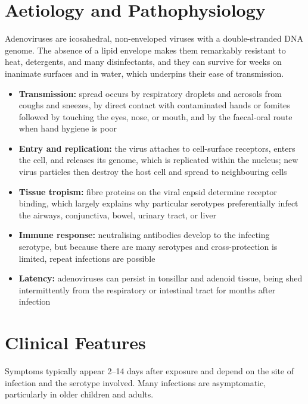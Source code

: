 \section*{Aetiology and Pathophysiology}
Adenoviruses are icosahedral, non-enveloped viruses with a double-stranded DNA genome. The absence of a lipid envelope makes them remarkably resistant to heat, detergents, and many disinfectants, and they can survive for weeks on inanimate surfaces and in water, which underpins their ease of transmission.

\begin{itemize}
    \item \textbf{Transmission:} spread occurs by respiratory droplets and aerosols from coughs and sneezes, by direct contact with contaminated hands or fomites followed by touching the eyes, nose, or mouth, and by the faecal-oral route when hand hygiene is poor
    \item \textbf{Entry and replication:} the virus attaches to cell-surface receptors, enters the cell, and releases its genome, which is replicated within the nucleus; new virus particles then destroy the host cell and spread to neighbouring cells
    \item \textbf{Tissue tropism:} fibre proteins on the viral capsid determine receptor binding, which largely explains why particular serotypes preferentially infect the airways, conjunctiva, bowel, urinary tract, or liver
    \item \textbf{Immune response:} neutralising antibodies develop to the infecting serotype, but because there are many serotypes and cross-protection is limited, repeat infections are possible
    \item \textbf{Latency:} adenoviruses can persist in tonsillar and adenoid tissue, being shed intermittently from the respiratory or intestinal tract for months after infection
\end{itemize}

\section*{Clinical Features}
Symptoms typically appear 2--14 days after exposure and depend on the site of infection and the serotype involved. Many infections are asymptomatic, particularly in older children and adults.

